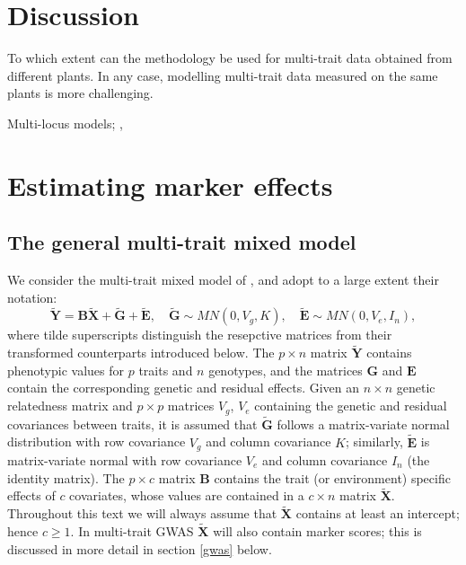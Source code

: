 \documentclass[12pt]{article}
\begin{document}
\section{Discussion}

To which extent can the methodology be used for multi-trait data obtained from different plants. In any case, modelling multi-trait data measured on the same plants is more challenging.

Multi-locus models; \cite{millet_etal_2016}, \cite{segura_etal_2012}

\appendix

\section{Estimating marker effects}


\subsection{The general multi-trait mixed model}

We consider the multi-trait mixed model of \cite{zhou_stephens_2014}, and adopt to a large extent their notation:
\begin{equation} \label{mtmm}
\mathbf{\tilde Y} = \mathbf{B}   \mathbf{\tilde X} + \mathbf{\tilde G} + \mathbf{\tilde E}, \quad \mathbf{\tilde G} \sim MN(0, V_g, K), \quad \mathbf{\tilde E} \sim MN(0, V_e, I_n),
\end{equation}
%
where tilde superscripts distinguish the resepctive matrices from their transformed counterparts introduced below. The $p \times n$ matrix $\mathbf{\tilde Y}$ contains phenotypic values for $p$ traits and $n$ genotypes, and the matrices $\mathbf{G}$ and $\mathbf{E}$ contain the corresponding genetic and residual effects. Given an $n \times n$ genetic relatedness matrix and $p \times p$ matrices $V_g$, $V_e$ containing the genetic and residual covariances between traits, it is assumed that $\mathbf{\tilde G}$ follows a matrix-variate normal distribution with row covariance $V_g$ and column covariance $K$; similarly, $\mathbf{\tilde E}$ is matrix-variate normal with row covariance $V_e$ and column covariance $I_n$ (the identity matrix). The $p \times c$ matrix $\mathbf{B}$ contains the trait (or environment) specific effects of $c$ covariates, whose values are contained in a $c \times n$ matrix $\mathbf{\tilde X}$.
Throughout this text we will always assume that $\mathbf{\tilde X}$ contains at least an intercept; hence $c \geq 1$. In multi-trait GWAS $\mathbf{\tilde X}$ will also contain marker scores; this is discussed in more detail in section \ref{gwas} below. 
\end{document}
